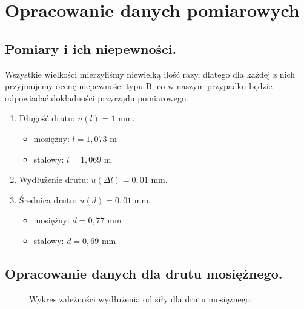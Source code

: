 \documentclass [a4paper,11pt]{article}
\begin{document}
	\renewcommand*{\figurename}{Wykres} 
	\setcounter{figure}{0}
	\newpage
	\section{Opracowanie danych pomiarowych}\label{sec:opr}
	\subsection{Pomiary i ich niepewności.}
		
		Wszystkie wielkości mierzyliśmy niewielką ilość razy, dlatego dla każdej z nich przyjmujemy ocenę niepewności typu B, co w naszym przypadku będzie odpowiadać dokładności przyrządu pomiarowego.
		\begin{enumerate}
			\item  Długość drutu: $u(l) = 1 \text{ mm}$.
			\begin{itemize}
				\item mosiężny: $ l = 1,073 \text{ m} $
				\item stalowy: $ l = 1,069 \text{ m} $
			\end{itemize}
			\item  Wydłużenie drutu: $u(\Delta l) = 0,01 \text{ mm}$.
			\item  Średnica drutu: $u(d) = 0,01 \text{ mm}$.
			\begin{itemize}
				\item mosiężny: $ d = 0,77 \text{ mm} $
				\item stalowy: $ d = 0,69 \text{ mm} $
			\end{itemize}
		\end{enumerate} 
	
	\subsection{Opracowanie danych dla drutu mosiężnego.}\label{sec:drm}
	\renewcommand*{\figurename}{Wykres} 
	\setcounter{figure}{1}
	\begin{figure}[!h]
		\centering

		\caption{Wykres zależności wydłużenia od siły dla drutu mosiężnego.}
		\label{fig:wykmosiadz}
	\end{figure}
\end{document}
